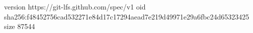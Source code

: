 version https://git-lfs.github.com/spec/v1
oid sha256:f48452756cad532271e84d17c17294aead7e219d49971e29a6fbc24d65323425
size 87544
